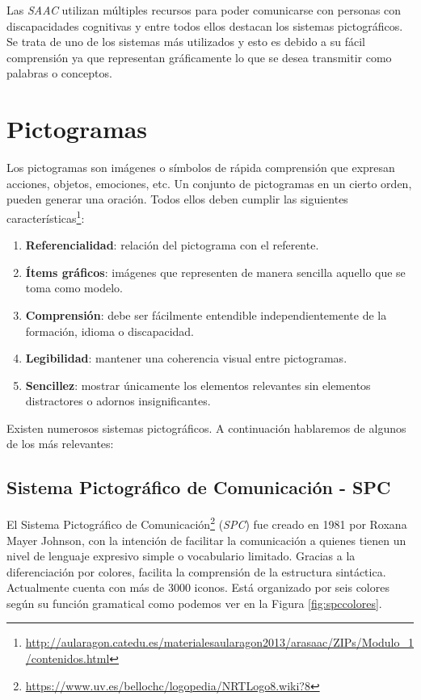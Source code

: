 Las \textit{SAAC} utilizan múltiples recursos para poder comunicarse con personas con discapacidades cognitivas y entre todos ellos destacan los sistemas pictográficos. Se trata de uno de los sistemas más utilizados y esto es debido a su fácil comprensión ya que representan gráficamente lo que se desea transmitir como palabras o conceptos. 

\section{Pictogramas}
\label{cap3:sec:pictogramas}
Los pictogramas son imágenes o símbolos de rápida comprensión que expresan acciones, objetos, emociones, etc. Un conjunto de pictogramas en un cierto orden, pueden generar una oración. Todos ellos deben cumplir las siguientes características\footnote{\url{http://aularagon.catedu.es/materialesaularagon2013/arasaac/ZIPs/Modulo_1/contenidos.html}}:
\begin{enumerate}
	\item \textbf{Referencialidad}: relación del pictograma con el referente.
	\item \textbf{Ítems gráficos}: imágenes que representen de manera sencilla aquello que se toma como modelo.
	\item \textbf{Comprensión}: debe ser fácilmente entendible independientemente de la formación, idioma o discapacidad.
	\item \textbf{Legibilidad}: mantener una coherencia visual entre pictogramas.
	\item \textbf{Sencillez}: mostrar únicamente los elementos relevantes sin elementos distractores o adornos insignificantes.
\end{enumerate}


 
Existen numerosos sistemas pictográficos. A continuación hablaremos de algunos de los más relevantes:

\subsection{Sistema Pictográfico de Comunicación - SPC}

El Sistema Pictográfico de Comunicación\footnote{\url{https://www.uv.es/bellochc/logopedia/NRTLogo8.wiki?8}} (\textit{SPC}) fue creado en 1981 por Roxana Mayer Johnson, con la intención de facilitar la comunicación a quienes tienen un nivel de lenguaje expresivo simple o vocabulario limitado. Gracias a la diferenciación por colores, facilita la comprensión de la estructura sintáctica. Actualmente cuenta con más de 3000 iconos. Está organizado por seis colores según su función gramatical como podemos ver en la Figura \ref{fig:spccolores}.

